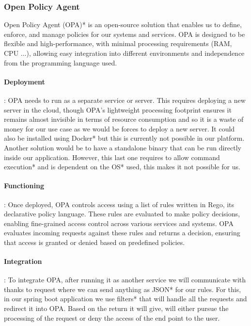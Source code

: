 \documentclass[12pt,a4paper,table,english]{article}
\begin{document}
	
	\subsubsection{Open Policy Agent}
	
	Open Policy Agent (OPA)*\citep{OPA} is an open-source solution that enables us to define, enforce, and manage policies for our systems and services. OPA is designed to be flexible and high-performance, with minimal processing requirements (RAM, CPU ...), allowing easy integration into different environments and independence from the programming language used. 
	
	
	\paragraph{Deployment}: OPA needs to run as a separate service or server. This requires deploying a new server in the cloud, though OPA's lightweight processing footprint ensures it remains almost invisible in terms of resource consumption and so it is a waste of money for our use case as we would be forces to deploy a new server. It could also be installed using Docker* but this is currently not possible in our platform. Another solution would be to have a standalone binary that can be run directly inside our application. However, this last one requires to allow command execution* and is dependent on the OS* used, this makes it not possible for us. 
	
	\pagebreak
	
	\paragraph{Functioning}: Once deployed, OPA controls access using a list of rules written in Rego, its declarative policy language. These rules are evaluated to make policy decisions, enabling fine-grained access control across various services and systems. OPA evaluates incoming requests against these rules and returns a decision, ensuring that access is granted or denied based on predefined policies. 
	
	
	\paragraph{Integration}: To integrate OPA, after running it as another service we will communicate with thanks to request where we can send anything as JSON* for our rules. For this, in our spring boot application we use filters* that will handle all the requests and redirect it into OPA. Based on the return it will give, will either pursue the processing of the request or deny the access of the end point to the user. 
	
\end{document}
